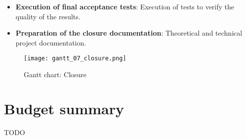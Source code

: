 \begin{itemize}
    \item \textbf{Execution of final acceptance tests}: Execution of tests to verify the quality of the results.
    \item \textbf{Preparation of the closure documentation}: Theoretical and technical project documentation.
\end{itemize}

\begin{figure}[H]
    \caption{Gantt chart: Closure}
  \centering
  \texttt{[image: gantt\_07\_closure.png]}
\end{figure}



\section{Budget summary}

TODO

